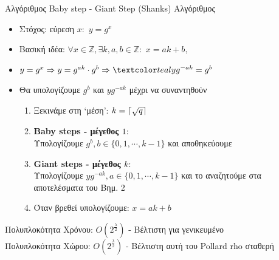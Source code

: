 \documentclass[handout]{beamer}
\DeclarePairedDelimiter{\ceil}{\lceil}{\rceil}
\begin{document}
\begin{frame}{Αλγόριθμος Baby step - Giant Step (Shanks)}
Αλγόριθμος 
\begin{itemize}
\item Στόχος: εύρεση $x:$ $y=g^x$
\item Βασική ιδέα:  $\forall x \in \mathbb{Z}, \exists k,a,b \in \mathbb{Z} :  \, \,  x = ak+b,  $ 
\pause
\item $y = g^x \Rightarrow y=g^{ak} \cdot g^{b} \Rightarrow \green{{y}{g^{-ak}}=g^{b}}$
\pause
\item Θα υπολογίζουμε $g^b$ και $yg^{-ak}$ μέχρι να συναντηθούν
\pause
\begin{enumerate}
\item Ξεκινάμε στη `μέση': $k = \ceil{\sqrt{q}}$\pause
\item \textbf{Baby steps - μέγεθος $1$}: \\Υπολογίζουμε $g^b, b \in \{0, 1, \cdots, k-1 \}$ και αποθηκεύουμε \pause
\item \textbf{Giant steps - μέγεθος $k$}:\\ Υπολογίζουμε ${yg^{-ak}}, a \in \{0, 1, \cdots, k-1 \}$ και το αναζητούμε στα αποτελέσματα του Βημ. 2 \pause
\item Όταν βρεθεί υπολογίζουμε: $x = ak+b$
\end{enumerate}
\end{itemize}
\begin{small}
Πολυπλοκότητα Χρόνου: $O(2^\frac{\lambda}{2})$ - \alert{Βέλτιστη} για γενικευμένο \\
Πολυπλοκότητα Χώρου: $O(2^\frac{\lambda}{2})$ -  Βέλτιστη αυτή του \alert{Pollard rho} σταθερή
\end{small}
\end{frame}
\end{document}

